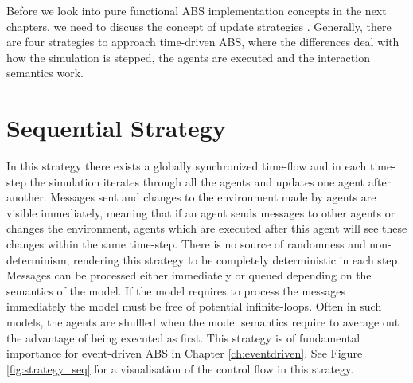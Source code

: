Before we look into pure functional ABS implementation concepts in the next chapters, we need to discuss the concept of update strategies \cite{thaler_art_2017}. Generally, there are four strategies to approach time-driven ABS, where the differences deal with how the simulation is stepped, the agents are executed and the interaction semantics work.


\section{Sequential Strategy}
In this strategy there exists a globally synchronized time-flow and in each time-step the simulation iterates through all the agents and updates one agent after another. Messages sent and changes to the environment made by agents are visible immediately, meaning that if an agent sends messages to other agents or changes the environment, agents which are executed after this agent will see these changes within the same time-step. There is no source of randomness and non-determinism, rendering this strategy to be completely deterministic in each step. Messages can be processed either immediately or queued depending on the semantics of the model. If the model requires to process the messages immediately the model must be free of potential infinite-loops. Often in such models, the agents are shuffled when the model semantics require to average out the advantage of being executed as first. This strategy is of fundamental importance for event-driven ABS in Chapter \ref{ch:eventdriven}. See Figure \ref{fig:strategy_seq} for a visualisation of the control flow in this strategy.


